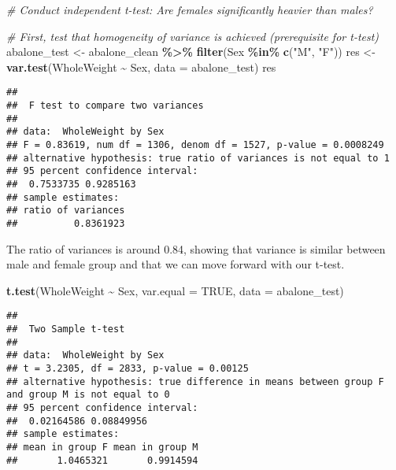 \documentclass[
]{article}
\newenvironment{Shaded}{\begin{snugshade}}{\end{snugshade}}
\newcommand{\AttributeTok}[1]{\textcolor[rgb]{0.13,0.29,0.53}{#1}}
\newcommand{\CommentTok}[1]{\textcolor[rgb]{0.56,0.35,0.01}{\textit{#1}}}
\newcommand{\ConstantTok}[1]{\textcolor[rgb]{0.56,0.35,0.01}{#1}}
\newcommand{\FunctionTok}[1]{\textcolor[rgb]{0.13,0.29,0.53}{\textbf{#1}}}
\newcommand{\NormalTok}[1]{#1}
\newcommand{\OtherTok}[1]{\textcolor[rgb]{0.56,0.35,0.01}{#1}}
\newcommand{\SpecialCharTok}[1]{\textcolor[rgb]{0.81,0.36,0.00}{\textbf{#1}}}
\newcommand{\StringTok}[1]{\textcolor[rgb]{0.31,0.60,0.02}{#1}}
\begin{document}
\begin{Shaded}
\begin{Highlighting}[]
\CommentTok{\# Conduct independent t{-}test: Are females significantly heavier than males?}

\CommentTok{\# First, test that homogeneity of variance is achieved (prerequisite for t{-}test)}
\NormalTok{abalone\_test }\OtherTok{\textless{}{-}}\NormalTok{ abalone\_clean }\SpecialCharTok{\%\textgreater{}\%} \FunctionTok{filter}\NormalTok{(Sex }\SpecialCharTok{\%in\%} \FunctionTok{c}\NormalTok{(}\StringTok{"M"}\NormalTok{, }\StringTok{"F"}\NormalTok{))}
\NormalTok{res }\OtherTok{\textless{}{-}} \FunctionTok{var.test}\NormalTok{(WholeWeight }\SpecialCharTok{\textasciitilde{}}\NormalTok{ Sex, }\AttributeTok{data =}\NormalTok{ abalone\_test)}
\NormalTok{res}
\end{Highlighting}
\end{Shaded}

\begin{verbatim}
## 
##  F test to compare two variances
## 
## data:  WholeWeight by Sex
## F = 0.83619, num df = 1306, denom df = 1527, p-value = 0.0008249
## alternative hypothesis: true ratio of variances is not equal to 1
## 95 percent confidence interval:
##  0.7533735 0.9285163
## sample estimates:
## ratio of variances 
##          0.8361923
\end{verbatim}

The ratio of variances is around 0.84, showing that variance is similar
between male and female group and that we can move forward with our
t-test.

\begin{Shaded}
\begin{Highlighting}[]
\FunctionTok{t.test}\NormalTok{(WholeWeight }\SpecialCharTok{\textasciitilde{}}\NormalTok{ Sex, }\AttributeTok{var.equal =} \ConstantTok{TRUE}\NormalTok{, }\AttributeTok{data =}\NormalTok{ abalone\_test)}
\end{Highlighting}
\end{Shaded}

\begin{verbatim}
## 
##  Two Sample t-test
## 
## data:  WholeWeight by Sex
## t = 3.2305, df = 2833, p-value = 0.00125
## alternative hypothesis: true difference in means between group F and group M is not equal to 0
## 95 percent confidence interval:
##  0.02164586 0.08849956
## sample estimates:
## mean in group F mean in group M 
##       1.0465321       0.9914594
\end{verbatim}
\end{document}
